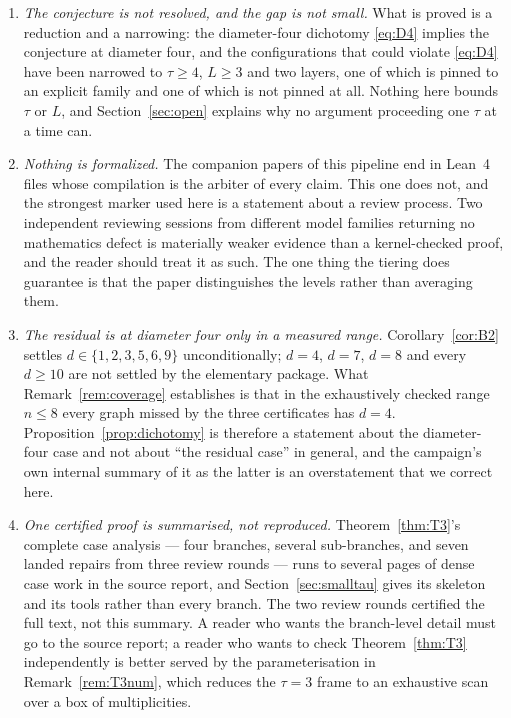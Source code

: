 \begin{enumerate}
\item \emph{The conjecture is not resolved, and the gap is not small.} What is proved is a
reduction and a narrowing: the diameter-four dichotomy \eqref{eq:D4} implies the conjecture
at diameter four, and the configurations that could violate \eqref{eq:D4} have been narrowed
to $\tau \ge 4$, $L \ge 3$ and two layers, one of which is pinned to an explicit family and
one of which is not pinned at all. Nothing here bounds $\tau$ or $L$, and
Section~\ref{sec:open} explains why no argument proceeding one $\tau$ at a time can.

\item \emph{Nothing is formalized.} The companion papers of this pipeline
\cite{batch1,fernandespaper} end in Lean~4 files whose compilation is the arbiter of every
claim. This one does not, and the strongest marker used here is a statement about a review
process. Two independent reviewing sessions from different model families returning no
mathematics defect is materially weaker evidence than a kernel-checked proof, and the reader
should treat it as such. The one thing the tiering does guarantee is that the paper
distinguishes the levels rather than averaging them.

\item \emph{The residual is at diameter four only in a measured range.}
Corollary~\ref{cor:B2} settles $d \in \{1,2,3,5,6,9\}$ unconditionally; $d = 4$, $d = 7$,
$d = 8$ and every $d \ge 10$ are not settled by the elementary package. What
Remark~\ref{rem:coverage} establishes is that in the exhaustively checked range $n \le 8$
every graph missed by the three certificates has $d = 4$. Proposition~\ref{prop:dichotomy}
is therefore a statement about the diameter-four case and not about ``the residual case''
in general, and the campaign's own internal summary of it as the latter is an overstatement
that we correct here.

\item \emph{One certified proof is summarised, not reproduced.}
Theorem~\ref{thm:T3}'s complete case analysis --- four branches, several sub-branches, and
seven landed repairs from three review rounds --- runs to several pages of dense case work
in the source report, and Section~\ref{sec:smalltau} gives its skeleton and its tools rather
than every branch. The two review rounds certified the full text, not this summary. A reader
who wants the branch-level detail must go to the source report; a reader who wants to check
Theorem~\ref{thm:T3} independently is better served by the parameterisation in
Remark~\ref{rem:T3num}, which reduces the $\tau = 3$ frame to an exhaustive scan over a
box of multiplicities.


\end{enumerate}
